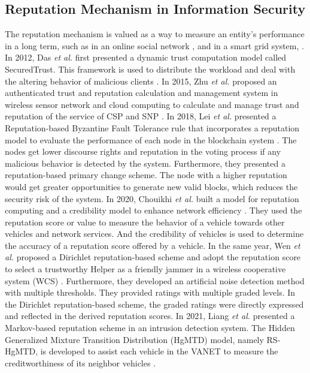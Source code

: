 \documentclass[journal]{IEEEtran}
\begin{document}
\subsection{Reputation Mechanism in Information Security}
The reputation mechanism is valued as a way to measure an entity's performance in a long term, such as in an online social network \cite{ref_27_reputation}, and in a smart grid system, \cite{ref_41_reputation, ref_44_reputation}.
In 2012, Das \textit{et al.} first presented a dynamic trust computation model called SecuredTrust. This framework is used to distribute the workload and deal with the altering behavior of malicious clients \cite{ref_48_reputation}.
In 2015, Zhu \textit{et al.} proposed an authenticated trust and reputation calculation and management system in wireless sensor network and cloud computing to calculate and manage trust and reputation of the service of CSP and SNP \cite{ref_47_reputation}.
In 2018, Lei \textit{et al.} presented a Reputation-based Byzantine Fault Tolerance rule that incorporates a reputation model to evaluate the performance of each node in the blockchain system \cite{ref_25_reputation}. The nodes get lower discourse rights and reputation in the voting process if any malicious behavior is detected by the system. Furthermore, they presented a reputation-based primary change scheme. The node with a higher reputation would get greater opportunities to generate new valid blocks, which reduces the security risk of the system.
In 2020, Chouikhi \textit{et al.} built a model for reputation computing and a credibility model to enhance network efficiency \cite{ref_23_reputation}. They used the reputation score or value to measure the behavior of a vehicle towards other vehicles and network services. And the credibility of vehicles is used to determine the accuracy of a reputation score offered by a vehicle. 
In the same year, Wen \textit{et al.} proposed a Dirichlet reputation-based scheme and adopt the reputation score to select a trustworthy Helper as a friendly jammer in a wireless cooperative system (WCS) \cite{ref_24_reputation}. Furthermore, they developed an artificial noise detection method with multiple thresholds. They provided ratings with multiple graded levels. In the Dirichlet reputation-based scheme, the graded ratings were directly expressed and reflected in the derived reputation scores.
In 2021, Liang \textit{et al.} presented a Markov-based reputation scheme in an intrusion detection system. The Hidden Generalized Mixture Transition Distribution (HgMTD) model, namely RS-HgMTD, is developed to assist each vehicle in the VANET to measure the creditworthiness of its neighbor vehicles \cite{ref_46_reputation}.
\end{document}

